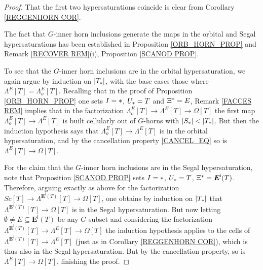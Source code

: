 \documentclass[a4paper,10pt
 ,draft
]{article}%
\begin{document}
\begin{proof}
	That the first two hypersaturations coincide is clear from Corollary \ref{REGGENHORN COR}.

	The fact that $G$-inner horn inclusions generate the maps in the orbital and Segal hypersaturations has been established in Proposition \ref{ORB_HORN_PROP} and Remark \ref{RECOVER REM}(i), Proposition \ref{SCANOD PROP}.
	
	To see that the $G$-inner horn inclusions are in the orbital hypersaturation, we again argue by induction on $|T_{\**}|$, with the base cases those where $\Lambda^{E} [T]=\Lambda^{E}_o [T]$.
	Recalling that in the proof of Proposition \ref{ORB_HORN_PROP}
	one sets
	$I=\**$, $U_{\**} = T$ and $\Xi^{\**} = E$,
	Remark \ref{FACCES REM} implies that in the factorization
	$\Lambda_o^E[T] \to \Lambda^E[T] \to \Omega[T]$
	the first map $\Lambda_o^E[T] \to \Lambda^E[T]$ is built cellularly out of $G$-horns with $|S_{\**}| < |T_{\**}|$.
	But then the induction hypothesis says that 
	$\Lambda_o^E[T] \to \Lambda^E[T]$ is in the orbital hypersaturation, and by the cancellation property \eqref{CANCEL_EQ} so is $\Lambda^E[T] \to \Omega[T]$.

	For the claim that the $G$-inner horn inclusions are in the Segal hypersaturation, note that Proposition \ref{SCANOD PROP} sets
	$I=\**$, $U_{\**} = T$, $\Xi^{\**} = \boldsymbol{E}^{\mathsf{i}}(T)$.
	Therefore, arguing exactly as above for the factorization
	$Sc[T] \to \Lambda^{\boldsymbol{E}^{\mathsf{i}}(T)}[T] \to \Omega[T]$,
	one obtains by induction on $|T_{\**}|$ that
	$\Lambda^{\boldsymbol{E}^{\mathsf{i}}(T)}[T] \to \Omega[T]$
	is in the Segal hypersaturation. 
	But now letting $\emptyset \neq E \subseteq \boldsymbol{E}^{\mathsf{i}}(T)$ be any $G$-subset and considering the factorization
	$\Lambda^{\boldsymbol{E}^{\mathsf{i}}(T)}[T] \to 
	\Lambda^{E}[T] \to
	\Omega[T]$ the induction hypothesis applies to the cells of
	$\Lambda^{\boldsymbol{E}^{\mathsf{i}}(T)}[T] \to \Lambda^{E}[T]$
	(just as in Corollary \ref{REGGENHORN COR}),
	which is thus also in the Segal hypersaturation.
	But by the cancellation property, so is 
	$\Lambda^{E}[T] \to \Omega[T]$, finishing the proof.
\end{proof}
\end{document}
